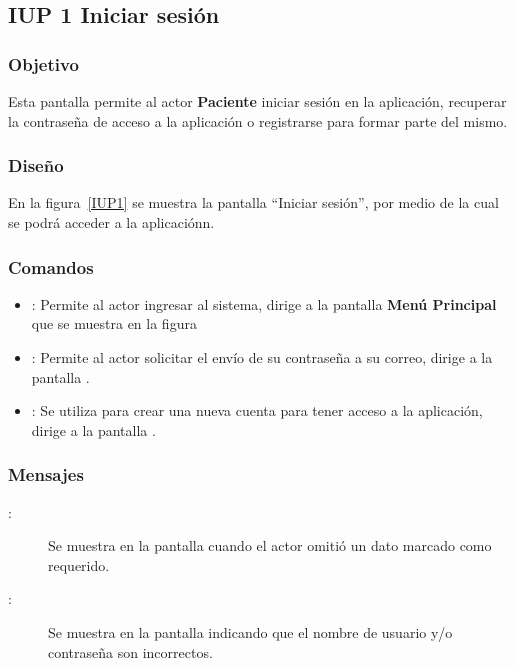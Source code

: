\subsection{IUP 1 Iniciar sesión}
 
\subsubsection{Objetivo}

    Esta pantalla permite al actor \textbf{Paciente} iniciar sesión en la aplicación, recuperar la contraseña de acceso a la aplicación o registrarse para formar parte del mismo.

\subsubsection{Diseño}

    En la figura~\ref{IUP1} se muestra la pantalla ``Iniciar sesión'', por medio de la cual se podrá acceder a la aplicaciónn. \\


\subsubsection{Comandos}
\begin{itemize}
    \item {}: Permite al actor ingresar al sistema, dirige a la pantalla \textbf{Menú Principal} que se muestra en la figura %
    \item {}: Permite al actor solicitar el envío de su contraseña a su correo, dirige a la pantalla .
    \item {}: Se utiliza para crear una nueva cuenta para tener acceso a la aplicación, dirige a la pantalla .
\end{itemize}

\subsubsection{Mensajes}

\begin{description}
    \item[:] Se muestra en la pantalla  cuando el actor omitió un dato marcado como requerido.
    \item[:] Se muestra en la pantalla  indicando que el nombre de usuario y/o contraseña son incorrectos.
\end{description}
